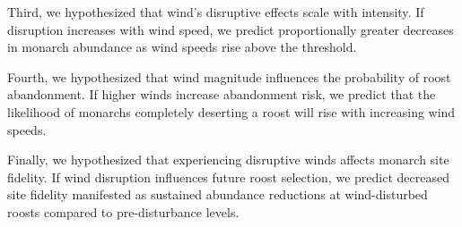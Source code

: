 Third, we hypothesized that wind's disruptive effects scale with intensity. If disruption increases with wind speed, we predict proportionally greater decreases in monarch abundance as wind speeds rise above the threshold.

Fourth, we hypothesized that wind magnitude influences the probability of roost abandonment. If higher winds increase abandonment risk, we predict that the likelihood of monarchs completely deserting a roost will rise with increasing wind speeds.

Finally, we hypothesized that experiencing disruptive winds affects monarch site fidelity. If wind disruption influences future roost selection, we predict decreased site fidelity manifested as sustained abundance reductions at wind-disturbed roosts compared to pre-disturbance levels.